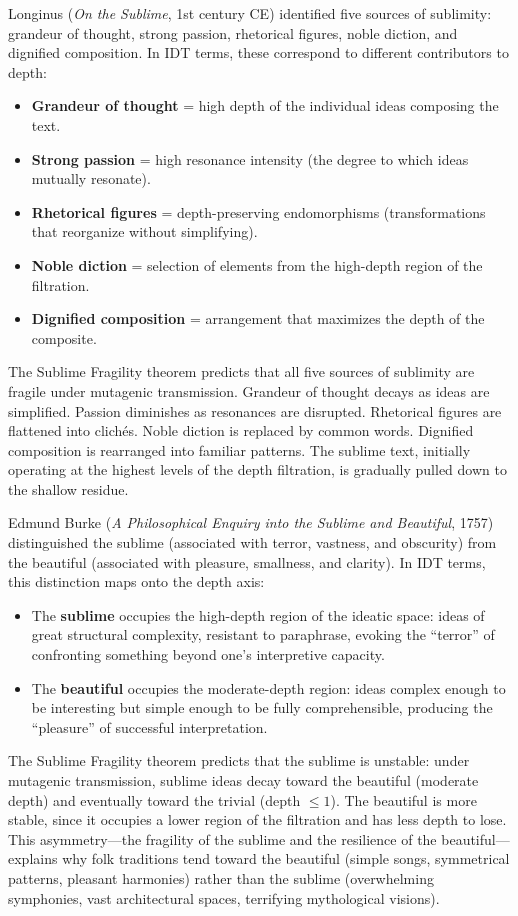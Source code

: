 \documentclass[11pt,openany]{book}
\theoremstyle{definition}
\theoremstyle{plain}
\theoremstyle{remark}
\begin{document}
Longinus (\textit{On the Sublime}, 1st century CE) identified five sources of sublimity: grandeur of thought, strong passion, rhetorical figures, noble diction, and dignified composition. In IDT terms, these correspond to different contributors to depth:
\begin{itemize}
\item \textbf{Grandeur of thought} = high depth of the individual ideas composing the text.
\item \textbf{Strong passion} = high resonance intensity (the degree to which ideas mutually resonate).
\item \textbf{Rhetorical figures} = depth-preserving endomorphisms (transformations that reorganize without simplifying).
\item \textbf{Noble diction} = selection of elements from the high-depth region of the filtration.
\item \textbf{Dignified composition} = arrangement that maximizes the depth of the composite.
\end{itemize}

The Sublime Fragility theorem predicts that all five sources of sublimity are fragile under mutagenic transmission. Grandeur of thought decays as ideas are simplified. Passion diminishes as resonances are disrupted. Rhetorical figures are flattened into clichés. Noble diction is replaced by common words. Dignified composition is rearranged into familiar patterns. The sublime text, initially operating at the highest levels of the depth filtration, is gradually pulled down to the shallow residue.

Edmund Burke (\textit{A Philosophical Enquiry into the Sublime and Beautiful}, 1757) distinguished the sublime (associated with terror, vastness, and obscurity) from the beautiful (associated with pleasure, smallness, and clarity). In IDT terms, this distinction maps onto the depth axis:
\begin{itemize}
\item The \textbf{sublime} occupies the high-depth region of the ideatic space: ideas of great structural complexity, resistant to paraphrase, evoking the ``terror'' of confronting something beyond one's interpretive capacity.
\item The \textbf{beautiful} occupies the moderate-depth region: ideas complex enough to be interesting but simple enough to be fully comprehensible, producing the ``pleasure'' of successful interpretation.
\end{itemize}
The Sublime Fragility theorem predicts that the sublime is unstable: under mutagenic transmission, sublime ideas decay toward the beautiful (moderate depth) and eventually toward the trivial (depth $\leq 1$). The beautiful is more stable, since it occupies a lower region of the filtration and has less depth to lose. This asymmetry---the fragility of the sublime and the resilience of the beautiful---explains why folk traditions tend toward the beautiful (simple songs, symmetrical patterns, pleasant harmonies) rather than the sublime (overwhelming symphonies, vast architectural spaces, terrifying mythological visions).
\end{document}

